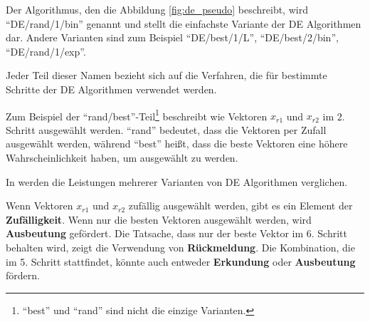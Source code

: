\documentclass[twoside,twocolumn]{article}
\begin{document}
Der Algorithmus, den die Abbildung \ref{fig:de_pseudo} beschreibt, wird \enquote{DE/rand/1/bin} genannt und stellt die einfachste Variante der DE Algorithmen dar. Andere Varianten sind zum Beispiel \enquote{DE/best/1/L}, \enquote{DE/best/2/bin}, \enquote{DE/rand/1/exp}.\par
Jeder Teil dieser Namen bezieht sich auf die Verfahren, die für bestimmte Schritte der DE Algorithmen verwendet werden.\par
Zum Beispiel der \enquote{rand/best}-Teil\footnote{\enquote{best} und \enquote{rand} sind nicht die einzige Varianten.} beschreibt wie Vektoren $x_{r1}$ und $x_{r2}$ im 2. Schritt ausgewählt werden. \enquote{rand} bedeutet, dass die Vektoren per Zufall ausgewählt werden, während \enquote{best} heißt, dass die beste Vektoren eine höhere Wahrscheinlichkeit haben, um ausgewählt zu werden.\par
In \cite{love_u_mex} werden die Leistungen mehrerer Varianten von DE Algorithmen verglichen.\par
Wenn Vektoren $x_{r1}$ und $x_{r2}$ zufällig ausgewählt werden, gibt es ein Element der \textbf{Zufälligkeit}. Wenn nur die besten Vektoren ausgewählt werden, wird \textbf{Ausbeutung} gefördert. Die Tatsache, dass nur der beste Vektor im 6. Schritt behalten wird, zeigt die Verwendung von \textbf{Rückmeldung}. Die Kombination, die im 5. Schritt stattfindet, könnte auch entweder \textbf{Erkundung} oder \textbf{Ausbeutung} fördern.

\end{document}
